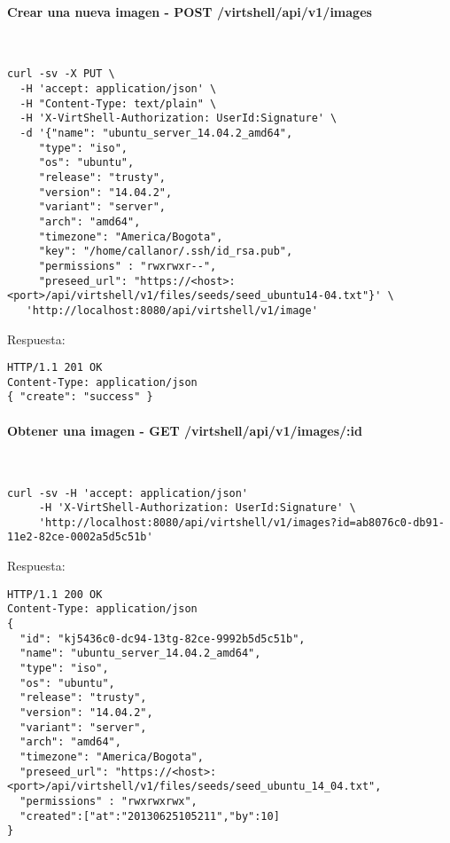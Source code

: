 \paragraph{Crear una nueva imagen - POST /virtshell/api/v1/images} ~\\

\begin{lstlisting}[style=json]
curl -sv -X PUT \
  -H 'accept: application/json' \
  -H "Content-Type: text/plain" \
  -H 'X-VirtShell-Authorization: UserId:Signature' \
  -d '{"name": "ubuntu_server_14.04.2_amd64",
     "type": "iso",
     "os": "ubuntu", 
     "release": "trusty",
     "version": "14.04.2", 
     "variant": "server", 
     "arch": "amd64", 
     "timezone": "America/Bogota", 
     "key": "/home/callanor/.ssh/id_rsa.pub",
     "permissions" : "rwxrwxr--",
     "preseed_url": "https://<host>:<port>/api/virtshell/v1/files/seeds/seed_ubuntu14-04.txt"}' \
   'http://localhost:8080/api/virtshell/v1/image'
\end{lstlisting}

\vspace{1cm}
Respuesta:
\vspace{1cm}

\begin{lstlisting}[style=json]
HTTP/1.1 201 OK
Content-Type: application/json
{ "create": "success" }
\end{lstlisting}

\paragraph{Obtener una imagen - GET /virtshell/api/v1/images/:id} ~\\

\begin{lstlisting}[style=json]
curl -sv -H 'accept: application/json' 
     -H 'X-VirtShell-Authorization: UserId:Signature' \ 
     'http://localhost:8080/api/virtshell/v1/images?id=ab8076c0-db91-11e2-82ce-0002a5d5c51b'
\end{lstlisting}

\vspace{1cm}
Respuesta:
\vspace{1cm}

\begin{lstlisting}[style=json]
HTTP/1.1 200 OK
Content-Type: application/json
{
  "id": "kj5436c0-dc94-13tg-82ce-9992b5d5c51b",
  "name": "ubuntu_server_14.04.2_amd64",
  "type": "iso",
  "os": "ubuntu", 
  "release": "trusty",
  "version": "14.04.2", 
  "variant": "server", 
  "arch": "amd64", 
  "timezone": "America/Bogota", 
  "preseed_url": "https://<host>:<port>/api/virtshell/v1/files/seeds/seed_ubuntu_14_04.txt",
  "permissions" : "rwxrwxrwx",
  "created":["at":"20130625105211","by":10]
}
\end{lstlisting}

